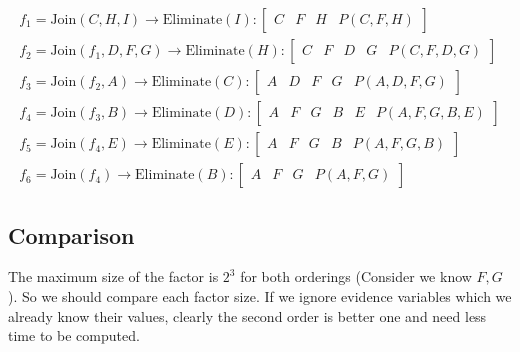 \documentclass[en]{university}
\begin{document}
\begin{align*}
    f_1 = \text{Join} (C, H, I) \rightarrow \text{Eliminate} (I) : \begin{bmatrix}
        C & F & H & P(C, F, H)
    \end{bmatrix} \\
    f_2 = \text{Join} (f_1, D, F, G) \rightarrow \text{Eliminate} (H) : \begin{bmatrix}
        C & F & D & G & P(C, F, D, G)
    \end{bmatrix} \\
    f_3 = \text{Join} (f_2, A) \rightarrow \text{Eliminate} (C) : \begin{bmatrix}
        A & D & F & G & P(A, D, F, G)
    \end{bmatrix} \\
    f_4 = \text{Join} (f_3, B) \rightarrow \text{Eliminate} (D) : \begin{bmatrix}
        A & F & G & B & E & P(A, F, G, B, E)
    \end{bmatrix} \\
    f_5 = \text{Join} (f_4, E) \rightarrow \text{Eliminate} (E) : \begin{bmatrix}
        A & F & G & B & P(A, F, G, B)
    \end{bmatrix} \\
    f_6 = \text{Join} (f_4) \rightarrow \text{Eliminate} (B) : \begin{bmatrix}
        A & F & G & P(A, F, G)
    \end{bmatrix}
\end{align*}

\subsection{Comparison}

The maximum size of the factor is $2^3$ for both orderings (Consider we know $F, G$). So we should compare each factor size. If we ignore evidence variables which we already 
know their values, clearly the second order is better one and need less time to be computed.

\section{}

\subsection{}
\end{document}
